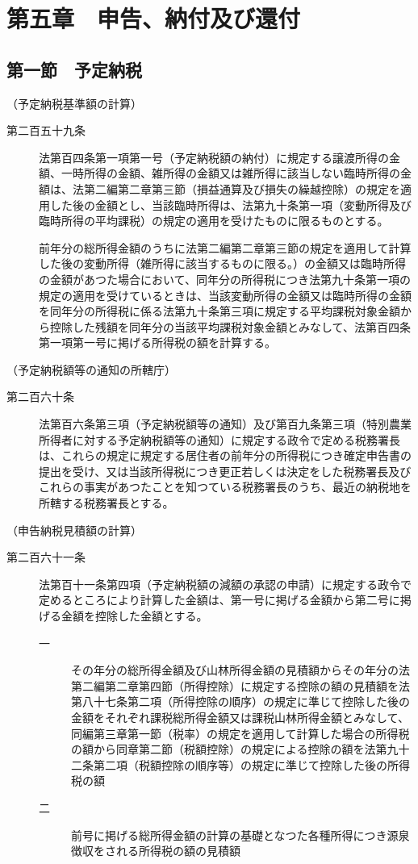 \documentclass[twocolumn,a4j,10pt]{ltjtarticle}
\begin{document}
\section*{第五章　申告、納付及び還付}
\subsection*{第一節　予定納税}
\noindent\hspace{10pt}（予定納税基準額の計算）
\begin{description}
\item[第二百五十九条]法第百四条第一項第一号（予定納税額の納付）に規定する譲渡所得の金額、一時所得の金額、雑所得の金額又は雑所得に該当しない臨時所得の金額は、法第二編第二章第三節（損益通算及び損失の繰越控除）の規定を適用した後の金額とし、当該臨時所得は、法第九十条第一項（変動所得及び臨時所得の平均課税）の規定の適用を受けたものに限るものとする。
\item[]前年分の総所得金額のうちに法第二編第二章第三節の規定を適用して計算した後の変動所得（雑所得に該当するものに限る。）の金額又は臨時所得の金額があつた場合において、同年分の所得税につき法第九十条第一項の規定の適用を受けているときは、当該変動所得の金額又は臨時所得の金額を同年分の所得税に係る法第九十条第三項に規定する平均課税対象金額から控除した残額を同年分の当該平均課税対象金額とみなして、法第百四条第一項第一号に掲げる所得税の額を計算する。
\end{description}
\noindent\hspace{10pt}（予定納税額等の通知の所轄庁）
\begin{description}
\item[第二百六十条]法第百六条第三項（予定納税額等の通知）及び第百九条第三項（特別農業所得者に対する予定納税額等の通知）に規定する政令で定める税務署長は、これらの規定に規定する居住者の前年分の所得税につき確定申告書の提出を受け、又は当該所得税につき更正若しくは決定をした税務署長及びこれらの事実があつたことを知つている税務署長のうち、最近の納税地を所轄する税務署長とする。
\end{description}
\noindent\hspace{10pt}（申告納税見積額の計算）
\begin{description}
\item[第二百六十一条]法第百十一条第四項（予定納税額の減額の承認の申請）に規定する政令で定めるところにより計算した金額は、第一号に掲げる金額から第二号に掲げる金額を控除した金額とする。
\begin{description}
\item[一]その年分の総所得金額及び山林所得金額の見積額からその年分の法第二編第二章第四節（所得控除）に規定する控除の額の見積額を法第八十七条第二項（所得控除の順序）の規定に準じて控除した後の金額をそれぞれ課税総所得金額又は課税山林所得金額とみなして、同編第三章第一節（税率）の規定を適用して計算した場合の所得税の額から同章第二節（税額控除）の規定による控除の額を法第九十二条第二項（税額控除の順序等）の規定に準じて控除した後の所得税の額
\item[二]前号に掲げる総所得金額の計算の基礎となつた各種所得につき源泉徴収をされる所得税の額の見積額
\end{description}
\end{description}
\end{document}
